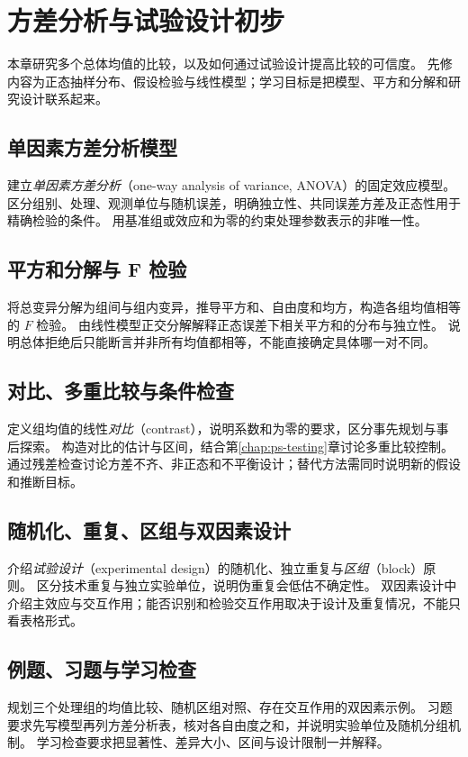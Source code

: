 \setcounter{chapter}{16} %
\chapter{方差分析与试验设计初步}
\label{chap:ps-anova}

本章研究多个总体均值的比较，以及如何通过试验设计提高比较的可信度。
先修内容为正态抽样分布、假设检验与线性模型；学习目标是把模型、平方和分解和研究设计联系起来。

\section{单因素方差分析模型}
\label{sec:ps-oneway-anova}
建立\emph{单因素方差分析}（one-way analysis of variance, ANOVA）的固定效应模型。
区分组别、处理、观测单位与随机误差，明确独立性、共同误差方差及正态性用于精确检验的条件。
用基准组或效应和为零的约束处理参数表示的非唯一性。

\section{平方和分解与 F 检验}
\label{sec:ps-anova-decomposition}
将总变异分解为组间与组内变异，推导平方和、自由度和均方，构造各组均值相等的 $F$ 检验。
由线性模型正交分解解释正态误差下相关平方和的分布与独立性。
说明总体拒绝后只能断言并非所有均值都相等，不能直接确定具体哪一对不同。

\section{对比、多重比较与条件检查}
\label{sec:ps-anova-contrasts}
定义组均值的线性\emph{对比}（contrast），说明系数和为零的要求，区分事先规划与事后探索。
构造对比的估计与区间，结合第\ref{chap:ps-testing}章讨论多重比较控制。
通过残差检查讨论方差不齐、非正态和不平衡设计；替代方法需同时说明新的假设和推断目标。

\section{随机化、重复、区组与双因素设计}
\label{sec:ps-experimental-design}
介绍\emph{试验设计}（experimental design）的随机化、独立重复与\emph{区组}（block）原则。
区分技术重复与独立实验单位，说明伪重复会低估不确定性。
双因素设计中介绍主效应与交互作用；能否识别和检验交互作用取决于设计及重复情况，不能只看表格形式。

\section{例题、习题与学习检查}
规划三个处理组的均值比较、随机区组对照、存在交互作用的双因素示例。
习题要求先写模型再列方差分析表，核对各自由度之和，并说明实验单位及随机分组机制。
学习检查要求把显著性、差异大小、区间与设计限制一并解释。





